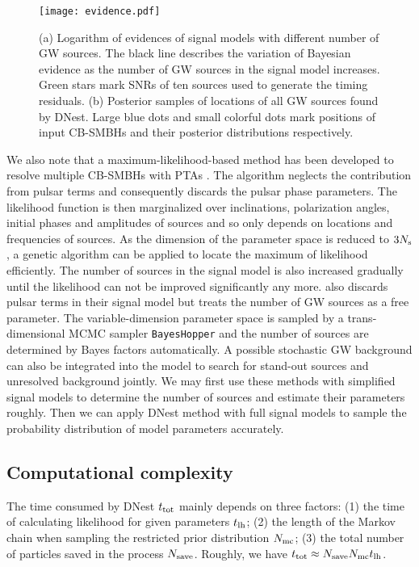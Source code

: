\documentclass[times,tight]{aastex631}
\begin{document}
\begin{figure}
    \centering
    \texttt{[image: evidence.pdf]}
    \caption{(a) Logarithm of evidences of signal models with different number of GW sources.
    The black line describes the variation of Bayesian evidence as the number of GW sources in the signal model increases.
    Green stars mark SNRs of ten sources used to generate the timing residuals.
    (b) Posterior samples of locations of all GW sources found by DNest.
    Large blue dots and small colorful dots mark positions of input CB-SMBHs and their posterior distributions respectively.
    \label{fig:evidence}}
\end{figure}

We also note that a maximum-likelihood-based method has been developed to resolve multiple CB-SMBHs with PTAs \citep{babak2012,petiteau2013}.
The algorithm neglects the contribution from pulsar terms and consequently discards the pulsar phase parameters.
The likelihood function is then marginalized over inclinations, polarization angles, initial phases and amplitudes of sources and so only depends on locations and frequencies of sources.
As the dimension of the parameter space is reduced to $3N_{\rm s}$, a genetic algorithm can be applied to locate the maximum of likelihood efficiently.
The number of sources in the signal model is also increased gradually until the likelihood can not be improved significantly any more.
\cite{becsy2020} also discards pulsar terms in their signal model but treats the number of GW sources as a free parameter.
The variable-dimension parameter space is sampled by a trans-dimensional MCMC sampler \texttt{BayesHopper} and the number of sources are determined by Bayes factors automatically.
A possible stochastic GW background can also be integrated into the model to search for stand-out sources and unresolved background jointly.
We may first use these methods with simplified signal models to determine the number of sources and estimate their parameters roughly.
Then we can apply DNest method with full signal models to sample the probability distribution of model parameters accurately.


\subsection{Computational complexity}
The time consumed by DNest $t_{\rm tot}$ mainly depends on three factors:
(1) the time of calculating likelihood for given parameters $t_{\rm lh}$;
(2) the length of the Markov chain when sampling the restricted prior distribution $N_{\rm mc}$;
(3) the total number of particles saved in the process $N_{\rm save}$.
Roughly, we have $t_{\rm tot} \approx N_{\rm save} N_{\rm mc} t_{\rm lh}$.
\end{document}
